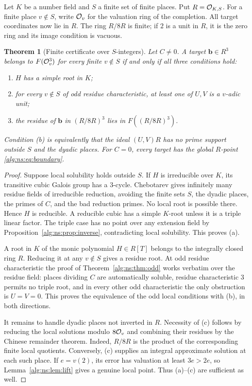 \documentclass[11pt]{article}
\numberwithin{equation}{section}
\newtheorem{theorem}{Theorem}[section]
\theoremstyle{plain}
\theoremstyle{plain}
\theoremstyle{plain}
\theoremstyle{definition}
\theoremstyle{definition}
\theoremstyle{definition}
\theoremstyle{remark}
\newcommand{\target}{\boldsymbol b}
\begin{document}
Let $K$ be a number field and $S$ a finite set of finite places. Put
$R=\mathcal O_{K,S}$. For a finite place $v\notin S$, write $\mathcal O_v$ for the
valuation ring of the completion. All target coordinates now lie in
$R$. The ring $R/8R$ is finite; if $2$ is a unit in $R$, it is the zero
ring and its image condition is vacuous.

\begin{theorem}[Finite certificate over $S$-integers]\label{alg:ns:thm:numberfields}
Let $C\ne0$. A target $\target\in R^3$ belongs to $F(\mathcal O_v^3)$ for
every finite $v\notin S$ if and only if all three conditions hold:
\begin{enumerate}[label=(\alph*)]
\item $H$ has a simple root in $K$;
\item for every $v\notin S$ of odd residue characteristic, at least one
of $U,V$ is a $v$-adic unit;
\item the residue of $\target$ in $(R/8R)^3$ lies in
$F((R/8R)^3)$.
\end{enumerate}
Condition (b) is equivalently that the ideal $(U,V)R$ has no prime
support outside $S$ and the dyadic places. For $C=0$, every target has
the global $R$-point \eqref{alg:ns:eq:boundary}.
\end{theorem}
\begin{proof}
Suppose local solubility holds outside $S$. If $H$ is irreducible over
$K$, its transitive cubic Galois group has a $3$-cycle. Chebotarev gives
infinitely many residue fields of irreducible reduction, avoiding the
finite sets $S$, the dyadic places, the primes of $C$, and the bad
reduction primes. No local root is possible there. Hence $H$ is
reducible. A reducible cubic has a simple $K$-root unless it is a triple
linear factor. The triple case has no point over any extension field
by Proposition~\ref{alg:ns:prop:inverse}, contradicting local solubility.
This proves (a).

A root in $K$ of the monic polynomial $H\in R[T]$ belongs to the
integrally closed ring $R$. Reducing it at any $v\notin S$ gives a
residue root. At odd residue characteristic the proof of
Theorem~\ref{alg:ns:thm:odd} works verbatim over the residue field: places
dividing $C$ are automatically soluble, residue characteristic $3$
permits no triple root, and in every other odd characteristic the only
obstruction is $U=V=0$. This proves the equivalence of the odd local
conditions with (b), in both directions.

It remains to handle dyadic places not inverted in $R$. Necessity of
(c) follows by reducing the local solutions modulo $8\mathcal O_v$ and
combining their residues by the Chinese remainder theorem. Indeed,
$R/8R$ is the product of the corresponding finite local quotients.
Conversely, (c) supplies an integral approximate solution at each such
place. If $e=v(2)$, its error has valuation at least $3e>2e$, so
Lemma~\ref{alg:ns:lem:lift} gives a genuine local point. Thus (a)--(c) are
sufficient as well.
\end{proof}
\end{document}
